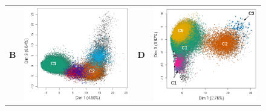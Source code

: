 \documentclass[12pt,a4paper]{article}
\begin{document}
\begin{figure}
\begin{tabular}{cc|cc}
		\textbf{B} & \includegraphics[scale=0.35]{img/solatus_ACP2.png} &  \textbf{D} & \includegraphics[scale=0.35]{img/pogonias_ACP2.png} \\

\end{tabular}
\end{figure}
\end{document}
